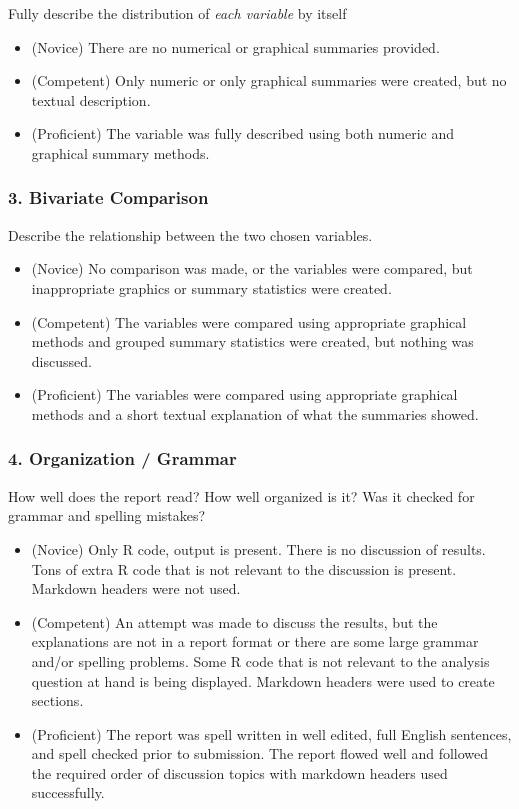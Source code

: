 \documentclass[
  letterpaper,
  DIV=11,
  numbers=noendperiod,
  oneside]{scrreprt}
\providecommand{\tightlist}{%
  \setlength{\itemsep}{0pt}\setlength{\parskip}{0pt}}\usepackage{longtable,booktabs,array}
\begin{document}
Fully describe the distribution of \emph{each variable} by itself

\begin{itemize}
\tightlist
\item
  (Novice) There are no numerical or graphical summaries provided.
\item
  (Competent) Only numeric or only graphical summaries were created, but
  no textual description.
\item
  (Proficient) The variable was fully described using both numeric and
  graphical summary methods.
\end{itemize}

\subsubsection*{3. Bivariate Comparison}\label{bivariate-comparison}

Describe the relationship between the two chosen variables.

\begin{itemize}
\tightlist
\item
  (Novice) No comparison was made, or the variables were compared, but
  inappropriate graphics or summary statistics were created.
\item
  (Competent) The variables were compared using appropriate graphical
  methods and grouped summary statistics were created, but nothing was
  discussed.
\item
  (Proficient) The variables were compared using appropriate graphical
  methods and a short textual explanation of what the summaries showed.
\end{itemize}

\subsubsection*{4. Organization / Grammar}\label{organization-grammar}

How well does the report read? How well organized is it? Was it checked
for grammar and spelling mistakes?

\begin{itemize}
\tightlist
\item
  (Novice) Only R code, output is present. There is no discussion of
  results. Tons of extra R code that is not relevant to the discussion
  is present. Markdown headers were not used.
\item
  (Competent) An attempt was made to discuss the results, but the
  explanations are not in a report format or there are some large
  grammar and/or spelling problems. Some R code that is not relevant to
  the analysis question at hand is being displayed. Markdown headers
  were used to create sections.
\item
  (Proficient) The report was spell written in well edited, full English
  sentences, and spell checked prior to submission. The report flowed
  well and followed the required order of discussion topics with
  markdown headers used successfully.
\end{itemize}
\end{document}
